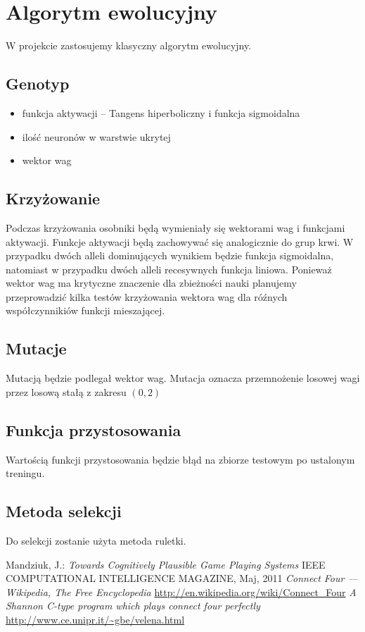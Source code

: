 \documentclass{llncs}
\begin{document}
\section{Algorytm ewolucyjny}
W projekcie zastosujemy klasyczny algorytm ewolucyjny.
\subsection{Genotyp}
\begin{itemize}
	\item funkcja aktywacji -- Tangens hiperboliczny i funkcja sigmoidalna		
	\item ilość neuronów w warstwie ukrytej
	\item wektor wag
\end{itemize}

\subsection{Krzyżowanie}
Podczas krzyżowania osobniki będą wymieniały się wektorami wag i funkcjami aktywacji. Funkcje aktywacji będą zachowywać
się analogicznie do grup krwi. W przypadku dwóch alleli dominujących wynikiem będzie funkcja sigmoidalna, natomiast w
przypadku dwóch alleli recesywnych funkcja liniowa.
Ponieważ wektor wag ma krytyczne znaczenie dla zbieżności nauki planujemy przeprowadzić kilka testów krzyżowania wektora
wag dla róźnych współczynnikiów funkcji mieszającej.

\subsection{Mutacje}
Mutacją będzie podlegał wektor wag. Mutacja oznacza przemnożenie losowej wagi przez losową stałą z zakresu $(0,2)$

\subsection{Funkcja przystosowania}
Wartością funkcji przystosowania będzie błąd na zbiorze testowym po ustalonym treningu.

\subsection{Metoda selekcji}
Do selekcji zostanie użyta metoda ruletki.

%
%
\begin{thebibliography}{4}
%
Mandziuk, J.:
\textsl{Towards Cognitively Plausible Game Playing Systems}
IEEE COMPUTATIONAL INTELLIGENCE MAGAZINE, Maj, 2011
\textsl{Connect Four --- {W}ikipedia{,} The Free Encyclopedia}
\url{http://en.wikipedia.org/wiki/Connect_Four}
\textsl{A Shannon C-type program which plays connect four perfectly}
\url{http://www.ce.unipr.it/~gbe/velena.html}
\end{thebibliography}
\end{document}
